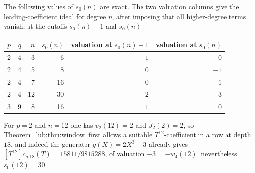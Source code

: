 \begin{proposition}\label{lub:prop:values}
The following values of $s_0(n)$ are exact. The two valuation columns give the
leading-coefficient ideal for degree $n$, after imposing that all higher-degree terms
vanish, at the cutoffs $s_0(n)-1$ and $s_0(n)$.
\begin{center}\upshape
\begin{tabular}{rrrrrr}
\toprule
$p$ & $q$ & $n$ & $s_0(n)$ & valuation at $s_0(n)-1$ & valuation at $s_0(n)$\\
\midrule
2&4&3&6&$1$&$0$\\
2&4&5&8&$0$&$-1$\\
2&4&7&16&$0$&$-1$\\
2&4&12&30&$-2$&$-3$\\
3&9&8&16&$1$&$0$\\
\bottomrule
\end{tabular}
\end{center}
For $p=2$ and $n=12$ one has $v_2(12)=2$ and $J_2(2)=2$, so Theorem~\ref{lub:thm:window} first
allows a suitable $T^{12}$-coefficient in a row at depth $18$, and indeed the generator
$g(X)=2X^3+3$ already gives $[T^{12}]c_{g,18}(T)=15811/9815288$, of valuation
$-3=-w_4(12)$; nevertheless $s_0(12)=30$.
\end{proposition}
